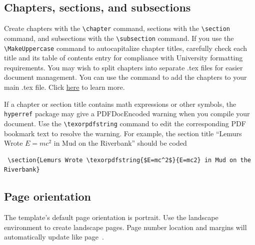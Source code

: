 \documentclass[11pt]{report}
\begin{document}
\begin{mainf}
\subsection{Chapters, sections, and subsections}
Create chapters with the \verb|\chapter| command, sections with the \verb|\section| command, and subsections with the \verb|\subsection| command. If you use the \verb|\MakeUppercase| command to autocapitalize chapter titles, carefully check each title and its table of contents entry for compliance with University formatting requirements. You may wish to split chapters into separate .tex files for easier document management. You can use the \verb|| command to add the chapters to your main .tex file. Click \underline{\href{https://www.overleaf.com/learn/latex/Management_in_a_large_project\#Inputting_and_including_files}{here}} to learn more.

If a chapter or section title contains math expressions or other symbols, the \verb|hyperref| package may give a PDFDocEncoded warning when you compile your document. Use the \verb|\texorpdfstring| command to edit the corresponding PDF bookmark text to resolve the warning. 
For example, the section title ``Lemurs Wrote $E=mc^2$ in Mud on the Riverbank'' should be coded
\begin{verbatim}
 \section{Lemurs Wrote \texorpdfstring{$E=mc^2$}{E=mc2} in Mud on the Riverbank}   
\end{verbatim}

\subsection{Page orientation}
The template's default page orientation is portrait. Use the landscape environment to create landscape pages. Page number location and margins will automatically update like page~\pageref{fig:landlemur1}.


\end{mainf}
\end{document}
